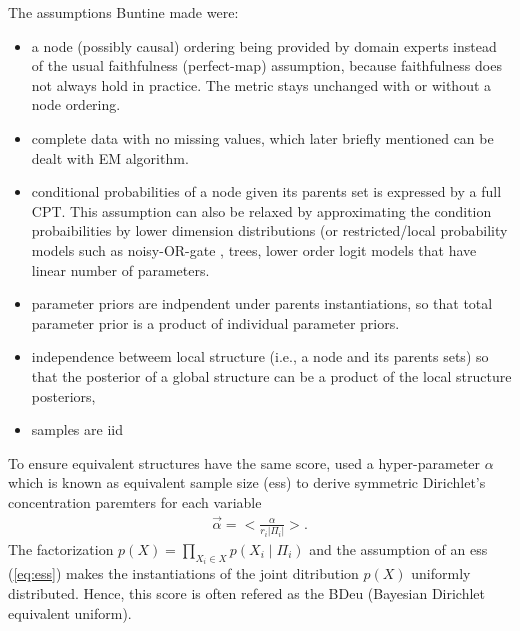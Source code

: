 The assumptions Buntine made were:
\begin{itemize}
\item a node (possibly causal) ordering being provided by domain experts instead of the usual faithfulness (perfect-map) assumption, because faithfulness does not always hold in practice. The metric stays unchanged with or without a node ordering. 
\item complete data with no missing values, which later briefly mentioned can be dealt with EM algorithm. 
\item conditional probabilities of a node given its parents set is expressed by a full CPT. This assumption can also be relaxed by approximating the condition probaibilities by lower dimension distributions (or restricted/local probability models such as noisy-OR-gate \cite{pearl1988probabilistic}, trees, lower order logit models \cite{neil1999learning} that have linear number of parameters. 
\item parameter priors are indpendent under parents instantiations, so that total parameter prior is a product of individual parameter priors. 
\item independence betweem local structure (i.e., a node and its parents sets) so that the posterior of a global structure can be a product of the local structure posteriors,
\item samples are iid
\end{itemize}

To ensure equivalent structures have the same score, \cite{buntine1991theory} used a hyper-parameter $\alpha$ which is known as equivalent sample size (ess) to derive symmetric Dirichlet's concentration paremters for each variable
\begin{align}
\label{eq:ess}
\vec{\alpha} = <\frac{\alpha}{r_i|\Pi_i|}>.
\end{align}
The factorization $p(X) = \prod_{X_i \in X} p(X_i \mid \Pi_i)$ and the assumption of an ess (\ref{eq:ess}) makes the instantiations of the joint ditribution $p(X)$ uniformly distributed. Hence, this score is often refered as the BDeu (Bayesian Dirichlet equivalent uniform). 

